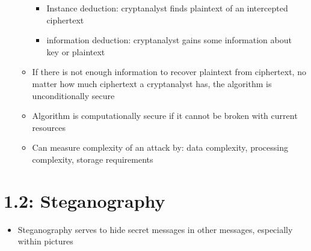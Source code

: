 \documentclass[]{article}
\begin{document}
\begin{itemize}
\begin{itemize}
\begin{itemize}
            \item Instance deduction: cryptanalyst finds plaintext of an intercepted ciphertext
            \item information deduction: cryptanalyst gains some information about key or plaintext
        \end{itemize}
        \item If there is not enough information to recover plaintext from ciphertext, no matter how much ciphertext a cryptanalyst has, the algorithm is unconditionally secure
        \item Algorithm is computationally secure if it cannot be broken with current resources
        \item Can measure complexity of an attack by: data complexity, processing complexity, storage requirements
    \end{itemize}
\end{itemize}
\section{1.2: Steganography}
\begin{itemize}
    \item Steganography serves to hide secret messages in other messages, especially within pictures
\end{itemize}
\end{document}
